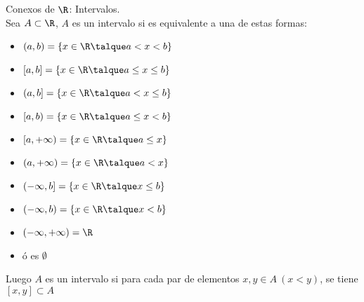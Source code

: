 	\begin{defi} Conexos de $\R$: Intervalos.\\
		Sea $A\subset \R$, $A$ es un intervalo si es equivalente a una de estas formas:
		\begin{itemize}
			\item $(a,b)=\{x\in\R \talque a<x<b\}$
			\item $[a,b]=\{x\in\R \talque a\leq x\leq b\}$
			\item $(a,b]=\{x\in\R \talque a< x\leq b\}$
			\item $[a,b)=\{x\in\R \talque a\leq x< b\}$
			\item $[a,+\infty)=\{x\in\R \talque a\leq x\}$
			\item $(a,+\infty)=\{x\in\R \talque a< x\}$
			\item $(-\infty, b]=\{x\in\R \talque  x\leq b\}$
			\item $(-\infty, b)=\{x\in\R \talque  x < b\}$
			\item $(-\infty, +\infty)=\R$ 
			\item ó es $\emptyset$
		\end{itemize}
	\end{defi}
	\begin{lema}
		Luego $A$ es un intervalo si para cada par de elementos $x,y\in A\ (x<y)$, se tiene $[x,y]\subset A$
 	\end{lema}
 	
